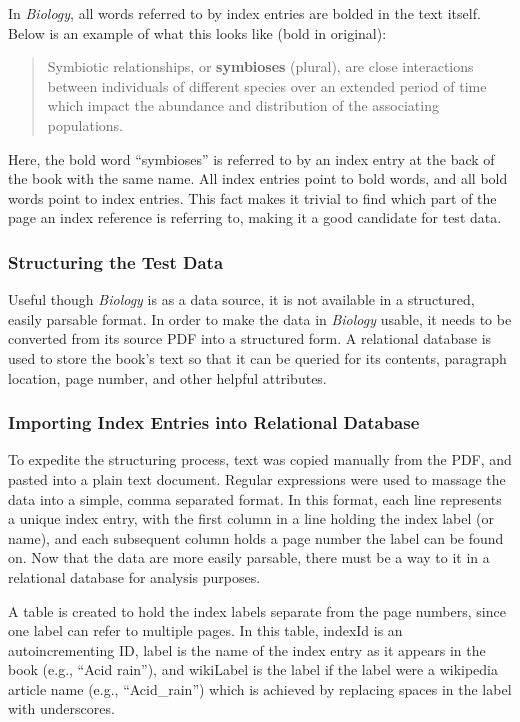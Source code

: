 In {\it Biology}, all words referred to by index entries are bolded in the text itself. Below is an example of what this looks like (bold in original):

\begin{quote}
Symbiotic relationships, or {\bf symbioses} (plural), are close interactions between individuals of different species over an extended period of time which impact the abundance and distribution of the associating populations. \cite{biology}
\end{quote}

\noindent Here, the bold word ``symbioses'' is referred to by an index entry at the back of the book with the same name. All index entries point to bold words, and all bold words point to index entries. This fact makes it trivial to find which part of the page an index reference is referring to, making it a good candidate for test data.

\subsubsection{Structuring the Test Data}

Useful though {\it Biology} is as a data source, it is not available in a structured, easily parsable format.
In order to make the data in {\it Biology} usable, it needs to be converted from its source PDF into a structured form.
A relational database is used to store the book's text so that it can be queried for its contents, paragraph location, page number, and other helpful attributes.

\subsubsection{Importing Index Entries into Relational Database}

To expedite the structuring process, text was copied manually from the PDF, and pasted into a plain text document.
Regular expressions were used to massage the data into a simple, comma separated format.
In this format, each line represents a unique index entry, with the first column in a line holding the index label (or name), and each subsequent column holds a page number the label can be found on.
Now that the data are more easily parsable, there must be a way to it in a relational database for analysis purposes.

A table is created to hold the index labels separate from the page numbers, since one label can refer to multiple pages.
In this table, indexId is an autoincrementing ID, label is the name of the index entry as it appears in the book (e.g., ``Acid rain''), and wikiLabel is the label if the label were a wikipedia article name (e.g., ``Acid\_rain'') which is achieved by replacing spaces in the label with underscores.

